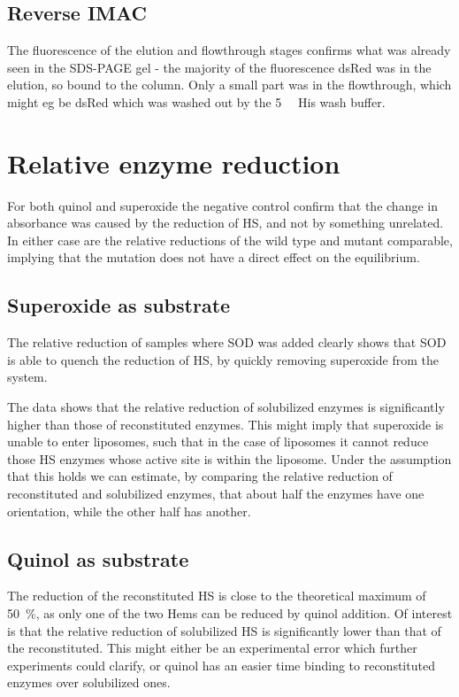 \subsection{Reverse IMAC}

The fluorescence of the elution and flowthrough stages confirms what was
already seen in the SDS-PAGE gel - the majority of the fluorescence dsRed was
in the elution, so bound to the column. Only a small part was in the
flowthrough, which might eg be dsRed which was washed out by the
\SI{5}{\milli\Molar} His wash buffer.

\section{Relative enzyme reduction}

For both quinol and superoxide the negative control confirm that the change in
absorbance was caused by the reduction of HS, and not by something unrelated.
In either case are the relative reductions of the wild type and mutant
comparable, implying that the mutation does not have a direct effect on the
equilibrium.

\subsection{Superoxide as substrate}

The relative reduction of samples where SOD was added clearly shows that SOD is
able to quench the reduction of HS, by quickly removing superoxide from the
system.

The data shows that the relative reduction of solubilized enzymes is
significantly higher than those of reconstituted enzymes. This might imply that
superoxide is unable to enter liposomes, such that in the case of liposomes it
cannot reduce those HS enzymes whose active site is within the liposome. Under
the assumption that this holds we can estimate, by comparing the relative
reduction of reconstituted and solubilized enzymes, that about half the enzymes
have one orientation, while the other half has another.

\subsection{Quinol as substrate}

The reduction of the reconstituted HS is close to the theoretical maximum of
\SI{50}{\percent}, as only one of the two Hems can be reduced by quinol
addition. Of interest is that the relative reduction of solubilized HS is
significantly lower than that of the reconstituted. This might either be an
experimental error which further experiments could clarify, or quinol has an
easier time binding to reconstituted enzymes over solubilized ones.

